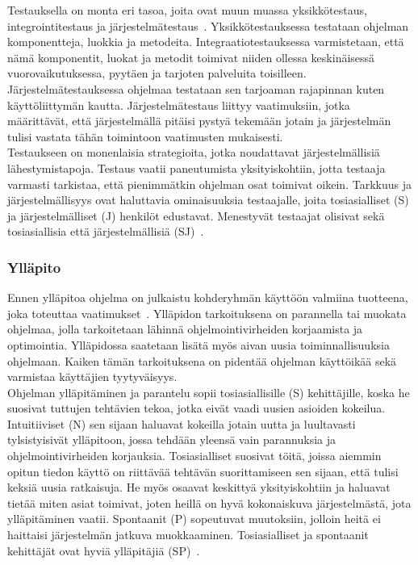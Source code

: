 \documentclass[finnish]{../tktltiki2}
\theoremstyle{definition}
\theoremstyle{remark}
\begin{document}
Testauksella on monta eri tasoa, joita ovat muun muassa yksikkötestaus,
integrointitestaus ja järjestelmätestaus~\cite{Capretz:2010:MSS:1726559.1726574}.
Yksikkötestauksessa testataan ohjelman komponentteja, luokkia
ja metodeita. Integraatiotestauksessa varmistetaan, että nämä komponentit, luokat ja metodit toimivat niiden ollessa keskinäisessä vuorovaikutuksessa, pyytäen ja tarjoten palveluita toisilleen. Järjestelmätestauksessa ohjelmaa testataan sen tarjoaman rajapinnan kuten käyttöliittymän kautta. Järjestelmätestaus liittyy vaatimuksiin, jotka määrittävät, että järjestelmällä pitäisi pystyä tekemään jotain ja järjestelmän tulisi vastata tähän toimintoon vaatimusten mukaisesti.\\

Testaukseen on monenlaisia strategioita, jotka noudattavat järjestelmälli\-siä lähestymistapoja. Testaus vaatii paneutumista yksityiskohtiin, jotta testaaja varmasti tarkistaa, että pienimmätkin ohjelman osat toimivat oikein. Tarkkuus ja järjestelmällisyys ovat
haluttavia ominaisuuksia testaajalle, joita tosiasialliset (S) ja järjestelmälliset (J) henkilöt edustavat. Menestyvät testaajat olisivat sekä tosiasiallisia että järjestelmällisiä (SJ)~\cite{Capretz:2010:MSS:1726559.1726574}.

\subsubsection{Ylläpito}

Ennen ylläpitoa ohjelma on julkaistu kohderyhmän käyttöön valmiina tuotteena, joka toteuttaa vaatimukset~\cite{SWEBOK:409902}. Ylläpidon
tarkoituksena on parannella tai muokata ohjelmaa, jolla tarkoitetaan lähinnä ohjelmointivirheiden
korjaamista ja optimointia. Ylläpidossa saatetaan lisätä myös aivan uusia toiminnallisuuksia
ohjelmaan. Kaiken tämän tarkoituksena on pidentää ohjelman käyttöikää sekä varmistaa käyttäjien
tyytyväisyys.\\

Ohjelman ylläpitäminen ja parantelu sopii tosiasiallisille (S) kehittäjille, koska he suosivat tuttujen tehtävien tekoa, jotka eivät vaadi uusien asioiden kokeilua. Intuitiiviset (N) sen sijaan haluavat kokeilla jotain uutta ja luultavasti tylsistyisivät ylläpitoon, jossa tehdään yleensä vain parannuksia ja ohjelmointivirheiden korjauksia. Tosiasialliset suosivat töitä, joissa aiemmin opitun tiedon käyttö on riittävää tehtävän suorittamiseen sen sijaan, että tulisi keksiä uusia ratkaisuja. He myös osaavat keskittyä yksityiskohtiin ja haluavat tietää miten asiat toimivat, joten heillä on hyvä kokonaiskuva järjestelmästä, jota ylläpitäminen vaatii. Spontaanit (P) sopeutuvat muutoksiin, jolloin heitä ei haittaisi järjestelmän jatkuva muokkaaminen. Tosiasialliset ja spontaanit kehittäjät ovat hyviä ylläpitäjiä (SP)~\cite{Capretz:2010:MSS:1726559.1726574}.\\
\end{document}
